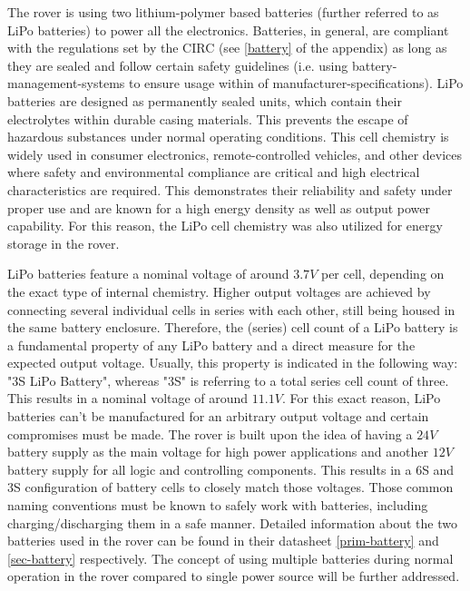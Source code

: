     The rover is using two lithium-polymer based batteries (further referred to as LiPo batteries) to power all the electronics. Batteries, in general, are compliant with the regulations set by the CIRC (see \ref{battery} of the appendix) as long as they are sealed and follow certain safety guidelines (i.e. using battery-management-systems to ensure usage within of manufacturer-specifications). LiPo batteries are designed as permanently sealed units, which contain their electrolytes within durable casing materials. This prevents the escape of hazardous substances under normal operating conditions. This cell chemistry is widely used in consumer electronics, remote-controlled vehicles, and other devices where safety and environmental compliance are critical and high electrical characteristics are required. This demonstrates their reliability and safety under proper use and are known for a high energy density as well as output power capability. For this reason, the LiPo cell chemistry was also utilized for energy storage in the rover.
    
    \vspace{5mm} %
    
    LiPo batteries feature a nominal voltage of around $3.7V$ per cell, depending on the exact type of internal chemistry. Higher output voltages are achieved by connecting several individual cells in series with each other, still being housed in the same battery enclosure. Therefore, the (series) cell count of a LiPo battery is a fundamental property of any LiPo battery and a direct measure for the expected output voltage. Usually, this property is indicated in the following way: "3S LiPo Battery", whereas "3S" is referring to a total series cell count of three. This results in a nominal voltage of around $11.1V$. For this exact reason, LiPo batteries can't be manufactured for an arbitrary output voltage and certain compromises must be made. The rover is built upon the idea of having a $24V$ battery supply as the main voltage for high power applications and another $12V$ battery supply for all logic and controlling components. This results in a 6S and 3S configuration of battery cells to closely match those voltages. Those common naming conventions must be known to safely work with batteries, including charging/discharging them in a safe manner. Detailed information about the two batteries used in the rover can be found in their datasheet \ref{prim-battery} and \ref{sec-battery} respectively. The concept of using multiple batteries during normal operation in the rover compared to single power source will be further addressed.

